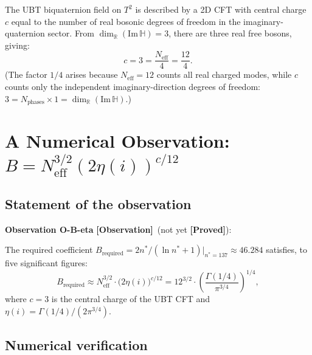 \documentclass[12pt,a4paper]{article}
\theoremstyle{definition}
\theoremstyle{remark}
\newcommand{\RR}{\mathbb{R}}
\newcommand{\HH}{\mathbb{H}}
\newcommand{\PROVED}{\textbf{[Proved]}}
\newcommand{\OBS}{\textbf{[Observation]}}
\begin{document}
The UBT biquaternion field on $T^2$ is described by a 2D CFT with central
charge $c$ equal to the number of real bosonic degrees of freedom in the
imaginary-quaternion sector.  From $\dim_\RR(\mathrm{Im}\,\HH) = 3$, there
are three real free bosons, giving:
\begin{equation}
  c = 3 = \frac{N_{\mathrm{eff}}}{4} = \frac{12}{4}.
  \label{eq:cw:c3}
\end{equation}
(The factor $1/4$ arises because $N_{\mathrm{eff}} = 12$ counts all real
charged modes, while $c$ counts only the independent imaginary-direction degrees
of freedom: $3 = N_{\mathrm{phases}} \times 1 = \dim_\RR(\mathrm{Im}\,\HH)$.)

\section{A Numerical Observation: $B = N_{\mathrm{eff}}^{3/2}(2\eta(i))^{c/12}$}
\label{sec:cw:obs}

\subsection{Statement of the observation}

\begin{obsbox}
\textbf{Observation O-B-eta} \OBS\ (not yet \PROVED):

The required coefficient $B_{\mathrm{required}} = 2n^*/(\ln n^* + 1)|_{n^*=137}
\approx 46.284$ satisfies, to five significant figures:
\begin{equation}
  \boxed{
    B_{\mathrm{required}}
    \approx N_{\mathrm{eff}}^{3/2} \cdot \bigl(2\eta(i)\bigr)^{c/12}
    = 12^{3/2} \cdot \left(\frac{\Gamma(1/4)}{\pi^{3/4}}\right)^{1/4},
  }
  \label{eq:cw:Bobs}
\end{equation}
where $c = 3$ is the central charge of the UBT CFT and $\eta(i) = \Gamma(1/4)/(2\pi^{3/4})$.
\end{obsbox}

\subsection{Numerical verification}
\end{document}
